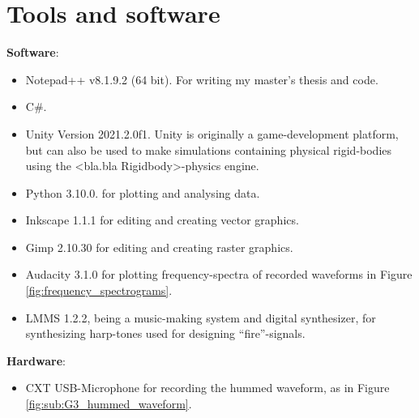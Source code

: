 \chapter{Tools and software}
\label{chap:tools_and_software}
	
	\textbf{Software}:
	\begin{itemize}
		\item Notepad++ v8.1.9.2 (64 bit). For writing my master's thesis and code.
		
		\item C\#.
		
		\item Unity Version 2021.2.0f1. Unity is originally a game-development platform, but can also be used to make  simulations containing physical rigid-bodies using the <bla.bla Rigidbody>-physics engine.
		
		\item Python 3.10.0. for plotting and analysing data.
		
		\item Inkscape 1.1.1 for editing and creating vector graphics.
		
		\item Gimp 2.10.30 for editing and creating raster graphics.
		
		\item Audacity 3.1.0 for plotting frequency-spectra of recorded waveforms in Figure \ref{fig:frequency_spectrograms}.
		
		\item LMMS 1.2.2, being a music-making system and digital synthesizer, for synthesizing harp-tones used for designing ``fire''-signals.
	\end{itemize}
	
	\textbf{Hardware}:
	\begin{itemize}
		\item CXT USB-Microphone for recording the hummed waveform, as in Figure \ref{fig:sub:G3_hummed_waveform}.
	\end{itemize}
	